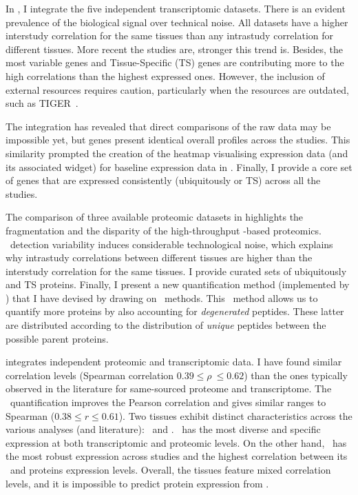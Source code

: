 In ,
I integrate the five independent transcriptomic datasets.
There is an evident prevalence of the biological signal over technical noise.
All datasets have a higher interstudy correlation for the same tissues
than any intrastudy correlation for different tissues.
More recent the studies are, stronger this trend is.
Besides,
the most variable genes and Tissue-Specific (\gls{TS}) genes are contributing
more to the high correlations than the highest expressed ones.
However, the inclusion of external resources requires caution,
particularly when the resources are outdated, such as \gls{TIGER}~.

The integration has revealed that
direct comparisons of the raw data may be impossible yet,
but genes present identical overall profiles across the studies.
This similarity prompted the creation of the heatmap visualising expression data
(and its associated widget) for baseline expression data in
.
Finally, I provide a core set of genes that are expressed consistently
(ubiquitously or \gls{TS}) across all the studies.

The comparison of three available proteomic datasets
in  highlights
the fragmentation and the disparity of the high-throughput \ms{}-based proteomics.
\ms\ detection variability induces considerable technological noise,
which explains
why intrastudy correlations between different tissues are
higher than the interstudy correlation for the same tissues.
I provide curated sets of ubiquitously and \gls{TS} proteins.
Finally, I present a new quantification method (implemented by \james) that
I have devised by drawing on \Rnaseq\ methods.
This \PPKM\ method allows us to quantify more proteins
by also accounting for \emph{degenerated} peptides.
These latter are distributed according to the distribution of \emph{unique} peptides
between the possible parent proteins.

 integrates independent proteomic and transcriptomic data.
I have found similar correlation levels
(Spearman correlation $0.39 ≤ \rho\ ≤ 0.62$)
than the ones typically observed in
the literature for same-sourced proteome and transcriptome.
The \PPKM\ quantification improves the Pearson correlation
and gives similar ranges to Spearman ($0.38 ≤ r ≤ 0.61$).
Two tissues exhibit distinct characteristics across the various analyses
(and literature): \Testis\ and \Liver.
\Testis\ has the most diverse and specific expression
at both transcriptomic and proteomic levels.
On the other hand, \Liver\ has the most robust expression across studies
and the highest correlation between its \mRNAs\ and proteins expression levels.
Overall, the tissues feature mixed correlation levels,
and it is impossible to predict protein expression from \mRNA{}.

